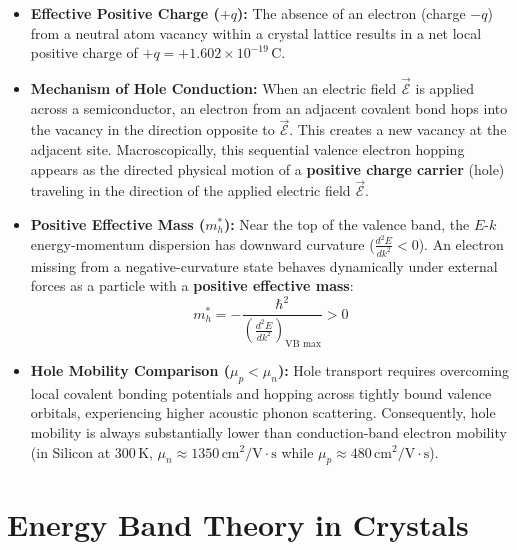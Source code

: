 \documentclass[12pt,a4paper]{article}
\begin{document}
\begin{tcolorbox}[defbox, title={\textbf{Physics and Fundamental Properties of Holes}}]
\begin{itemize}[leftmargin=*, itemsep=3pt]
  \item \textbf{Effective Positive Charge ($+q$):} The absence of an electron (charge $-q$) from a neutral atom vacancy within a crystal lattice results in a net local positive charge of $+q = +1.602 \times 10^{-19}\,\text{C}$.
  \item \textbf{Mechanism of Hole Conduction:} When an electric field $\vec{\mathcal{E}}$ is applied across a semiconductor, an electron from an adjacent covalent bond hops into the vacancy in the direction opposite to $\vec{\mathcal{E}}$. This creates a new vacancy at the adjacent site. Macroscopically, this sequential valence electron hopping appears as the directed physical motion of a \textbf{positive charge carrier} (hole) traveling in the direction of the applied electric field $\vec{\mathcal{E}}$.
  \item \textbf{Positive Effective Mass ($m_h^*$):} Near the top of the valence band, the $E\text{-}k$ energy-momentum dispersion has downward curvature ($\frac{d^2 E}{dk^2} < 0$). An electron missing from a negative-curvature state behaves dynamically under external forces as a particle with a \textbf{positive effective mass}:
  \begin{equation}
    m_h^* = -\frac{\hbar^2}{\left(\frac{d^2 E}{dk^2}\right)_{\text{VB max}}} > 0
  \end{equation}
  \item \textbf{Hole Mobility Comparison ($\mu_p < \mu_n$):} Hole transport requires overcoming local covalent bonding potentials and hopping across tightly bound valence orbitals, experiencing higher acoustic phonon scattering. Consequently, hole mobility is always substantially lower than conduction-band electron mobility (in Silicon at $300\,\text{K}$, $\mu_n \approx 1350\,\text{cm}^2/\text{V}\cdot\text{s}$ while $\mu_p \approx 480\,\text{cm}^2/\text{V}\cdot\text{s}$).
\end{itemize}
\end{tcolorbox}

\section{Energy Band Theory in Crystals}
\end{document}
